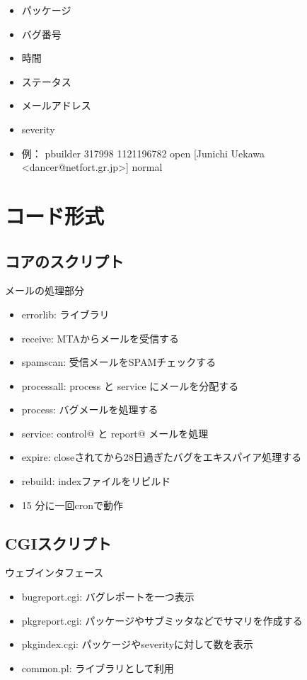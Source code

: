 \documentclass[cjk,dvipdfmx]{beamer}
\begin{document}
\begin{frame}
\begin{itemize}
 \item パッケージ
 \item バグ番号
 \item 時間
 \item ステータス
 \item メールアドレス
 \item severity
 \item 例： pbuilder 317998 1121196782 open [Junichi Uekawa <dancer@netfort.gr.jp>] normal
\end{itemize}
\end{frame}

\section{コード形式}


\subsection{コアのスクリプト}

\begin{frame}
 メールの処理部分
 \begin{itemize}
  \item errorlib: ライブラリ
  \item receive: MTAからメールを受信する
  \item spamscan: 受信メールをSPAMチェックする
  \item processall: process と service にメールを分配する
  \item process: バグメールを処理する
  \item service: control@ と report@ メールを処理
  \item expire: closeされてから28日過ぎたバグをエキスパイア処理する
  \item rebuild: indexファイルをリビルド
  \item 15 分に一回cronで動作
 \end{itemize}
\end{frame}

\subsection{CGIスクリプト}

\begin{frame}
 ウェブインタフェース
 \begin{itemize}
 \item bugreport.cgi: バグレポートを一つ表示
 \item pkgreport.cgi: パッケージやサブミッタなどでサマリを作成する
 \item pkgindex.cgi: パッケージやseverityに対して数を表示
 \item common.pl: ライブラリとして利用
 \end{itemize}
\end{frame}
\end{document}

